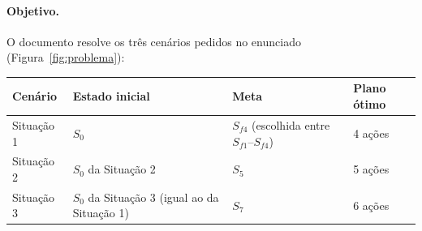 \paragraph{Objetivo.} O documento resolve os três cenários pedidos no enunciado
(Figura~\ref{fig:problema}):
\begin{center}\small
	\begin{tabular}{@{}llll@{}}
		\toprule
		Cenário & Estado inicial & Meta & Plano ótimo\\
		\midrule
		Situação 1 & $S_0$ & $S_{f4}$ (escolhida entre $S_{f1}$--$S_{f4}$) & 4 ações\\
		Situação 2 & $S_0$ da Situação 2 & $S_5$ & 5 ações\\
		Situação 3 & $S_0$ da Situação 3 (igual ao da Situação 1) & $S_7$ & 6 ações\\
		\bottomrule
	\end{tabular}
\end{center}
